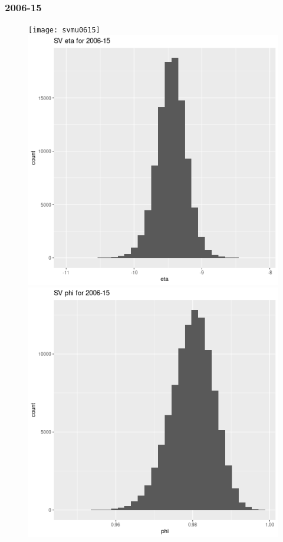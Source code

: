 \documentclass[12pt,letterpaper,reqno,fleqn]{article}
\begin{document}
\subsubsection{2006-15}
\begin{figure}
\texttt{[image: svmu0615]}
\includegraphics[scale = .4]{sve0615}
\includegraphics[scale = .4]{svp0615}

\end{figure}
\end{document}
